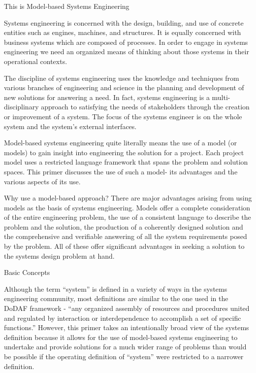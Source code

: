 This is Model-based Systems Engineering

Systems engineering is concerned with the design, building, and use of concrete entities such as engines, machines, and structures. It is equally concerned with business systems which are composed of processes. In order to engage in systems engineering we need an organized means of thinking about those systems in their operational contexts. 

The discipline of systems engineering uses the knowledge and techniques from various branches of engineering and science in the planning and development of new solutions for answering a need. In fact, systems engineering is a multi-disciplinary approach to satisfying the needs of stakeholders through the creation or improvement of a system. The focus of the systems engineer is on the whole system and the system’s external interfaces. 

Model-based systems engineering quite literally means the use of a model (or models) to gain insight into engineering the solution for a project. Each project model uses a restricted language framework that spans the problem and solution spaces. This primer discusses the use of such a model- its advantages and the various aspects of its use.

Why use a model-based approach?
There are major advantages arising from using models as the basis of systems engineering. Models offer a complete consideration of the entire engineering problem, the use of a consistent language to describe the problem and the solution, the production of a coherently designed solution and the comprehensive and verifiable answering of all the system requirements posed by the problem. All of these offer significant advantages in seeking a solution to the systems design problem at hand.

Basic Concepts

Although the term ``system'' is defined in a variety of ways in the systems engineering community, most definitions are similar to the one used in the DoDAF framework - ``any organized assembly of resources and procedures united and regulated by interaction or interdependence to accomplish a set of specific functions.'' However, this primer takes an intentionally broad view of the systems definition because it allows for the use of model-based systems engineering to undertake and provide solutions for a much wider range of problems than would be possible if the operating definition of ``system'' were restricted to a narrower definition.

